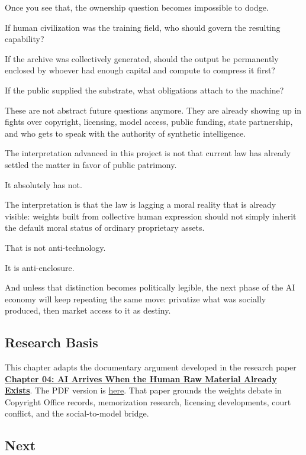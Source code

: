 \documentclass[
  american,
  12pt,
  letterpaper,
]{article}
\begin{document}
Once you see that, the ownership question becomes impossible to dodge.

If human civilization was the training field, who should govern the
resulting capability?

If the archive was collectively generated, should the output be
permanently enclosed by whoever had enough capital and compute to
compress it first?

If the public supplied the substrate, what obligations attach to the
machine?

These are not abstract future questions anymore. They are already
showing up in fights over copyright, licensing, model access, public
funding, state partnership, and who gets to speak with the authority of
synthetic intelligence.

The interpretation advanced in this project is not that current law has
already settled the matter in favor of public patrimony.

It absolutely has not.

The interpretation is that the law is lagging a moral reality that is
already visible: weights built from collective human expression should
not simply inherit the default moral status of ordinary proprietary
assets.

That is not anti-technology.

It is anti-enclosure.

And unless that distinction becomes politically legible, the next phase
of the AI economy will keep repeating the same move: privatize what was
socially produced, then market access to it as destiny.

\subsection{Research Basis}\label{research-basis-4}

This chapter adapts the documentary argument developed in the research
paper
\href{../../papers/html/04_data-models-weights_paper.html}{\textbf{Chapter
04: AI Arrives When the Human Raw Material Already Exists}}. The PDF
version is
\href{../../papers/pdf/04_data-models-weights_paper/04_data-models-weights_paper.pdf}{here}.
That paper grounds the weights debate in Copyright Office records,
memorization research, licensing developments, court conflict, and the
social-to-model bridge.

\subsection{Next}\label{next-4}
\end{document}
